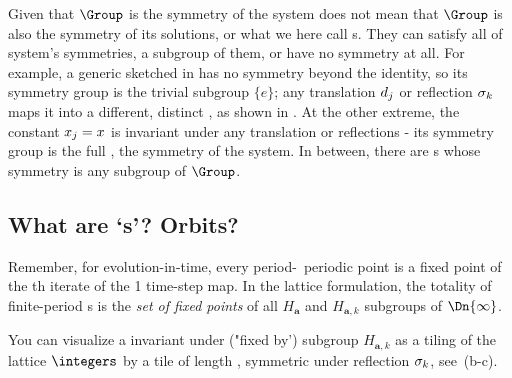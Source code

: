 Given that $\Group$ is the {symmetry} of the system does not mean that
$\Group$ is also the symmetry of its solutions, or what we here call {\em
\lattstate}s.
They can satisfy
all of system's symmetries, a subgroup of them, or have no symmetry at
all.
For example, a generic {\lattstate}  sketched in
 has no symmetry beyond the identity, so its
symmetry group is the trivial subgroup $\{e\}$; any translation
$d_j$ or reflection $\sigma_k$ maps it into a different, distinct
{\lattstate}, as shown in .
At the other extreme, the constant {\lattstate}
$x_j=x$ is invariant under any translation or reflections - its
symmetry group is the full \Group, the symmetry of the system. In
between, there are {\lattstate}s whose symmetry is any subgroup of
$\Group$.

\subsection{What are `{\lattstate}s'? Orbits?}
\label{s:LattStates}

Remember, for evolution-in-time, every period-\cl{}\ periodic point is a
fixed point of the \cl{}th iterate of the 1 time-step map. In the lattice
formulation, the totality of finite-period {\lattstate}s is the \emph{set
of fixed points} of all  $H_{\mathbf{a}}$ and  $H_{\mathbf{a},k}$
subgroups of $\Dn{\infty}$.

You can visualize a {\lattstate} invariant under ("fixed by') subgroup
$H_{\mathbf{a},k}$ as a tiling of the lattice $\integers$ by a
{\lattstate} tile of length \cl{}, symmetric under reflection $\sigma_k$,
see \,(b-c).

